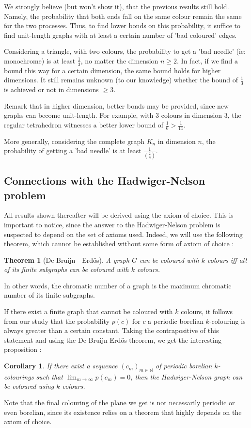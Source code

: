 \documentclass[a4paper,11pt]{article}
\newtheorem{cons}{Corollary}
\newtheorem{theo}{Theorem}
\theoremstyle{definition}
\theoremstyle{remark}
\begin{document}
We strongly believe (but won't show it), that the previous results still hold. Namely, the probability that both ends fall on the same colour remain the same for the two processes. Thus, to find lower bonds on this probability, it suffice to find unit-length graphs with at least a certain number of 'bad coloured' edges.

Considering a triangle, with two colours, the probability to get a 'bad needle' (ie: monochrome) is at least $\frac{1}{3}$, no matter the dimension $n \geq 2$. In fact, if we find a bound this way for a certain dimension, the same bound holds for higher dimensions. It still remains unknown (to our knowledge) whether the bound of $\frac{1}{3}$ is achieved or not in dimensions $\geq 3$. 


Remark that in higher dimension, better bonds may be provided, since new graphs can 
become unit-length. For example, with $3$ colours in dimension $3$, the regular 
tetrahedron witnesses a better lower bound 
of $\frac 1 6 >\frac 1 {11}$.


More generally, considering the complete graph $K_n$ in dimension $n$, the probability of getting 
a 'bad needle' is at least $ \frac{1}{\binom 2 n}$.

\subsection{Connections with the Hadwiger-Nelson problem} \label{hn}
All results shown thereafter will be derived using the axiom of choice. 
This is important to notice, since the answer to the Hadwiger-Nelson problem is 
suspected to depend on the set of axioms used. Indeed, we will use the 
following theorem, which cannot be established without some form of axiom of 
choice :
\begin{theo}[De Bruijn - Erdős]
 A graph $G$ can be coloured with $k$ colours iff all of its finite subgraphs 
 can be coloured with $k$ colours.
\end{theo}
In other words, the chromatic number of a graph is the maximum chromatic number 
of its finite subgraphs.

If there exist a finite graph that cannot be coloured with $k$ colours, it 
follows from our study that the probability $p(c)$ for $c$ a periodic borelian 
$k$-colouring is always greater than a certain constant. Taking the 
contrapositive of this statement and using the De Bruijn-Erdős theorem, we get  
the interesting proposition :
\begin{cons}
 If there exist a sequence $(c_m)_{m \in \mathbb{N}}$ of periodic borelian 
 $k$-colourings such that $\lim_{m \to \infty} p(c_m) = 0$, then the 
 Hadwiger-Nelson graph can be coloured using $k$ colours.
\end{cons}
Note that the final colouring of the plane we get is not necessarily periodic 
or even borelian, since its existence relies on a theorem that highly depends 
on the axiom of choice.
\end{document}
